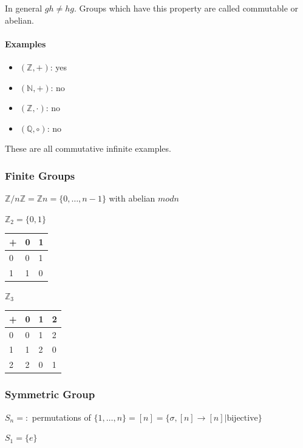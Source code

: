 \documentclass[a4paper,oneside,11pt]{article}
\begin{document}
In general $gh\neq hg$.
Groups which have this property are called commutable or abelian.

\paragraph{Examples}
\begin{itemize}
    \item $(\mathbb{Z},+)$: yes
    \item $(\mathbb{N},+)$: no
    \item $(\mathbb{Z},\cdot)$: no
    \item $(\mathbb{Q},\circ)$: no
\end{itemize}

These are all commutative infinite examples.

\subsubsection{Finite Groups}
$\mathbb{Z}/n\mathbb{Z}=\mathbb{Z}n=\{0,\dots,n-1\}$ with abelian $mod n$

$\mathbb{Z}_2=\{0,1\}$

\begin{table}[h!]
\begin{tabular}{|l|l|l|}
\hline
+    & 0    & 1 \\ \hline
0    & 0    & 1 \\ \hline
1    & 1    & 0    \\ \hline
\end{tabular}
\end{table}

$\mathbb{Z}_3$
\begin{table}[h!]
\begin{tabular}{|l|l|l|l|}
\hline
+ & 0 & 1 & 2 \\ \hline
0 & 0 & 1 & 2 \\ \hline
1 & 1 & 2 & 0 \\ \hline
2 & 2 & 0 & 1 \\ \hline
\end{tabular}
\end{table}

\subsubsection{Symmetric Group}
$S_n=: $ permutations of $\{1,\dots,n\}=[n]=\{\sigma,[n]\to[n]|\text{bijective}\}$

$S_1=\{e\}$
\end{document}
